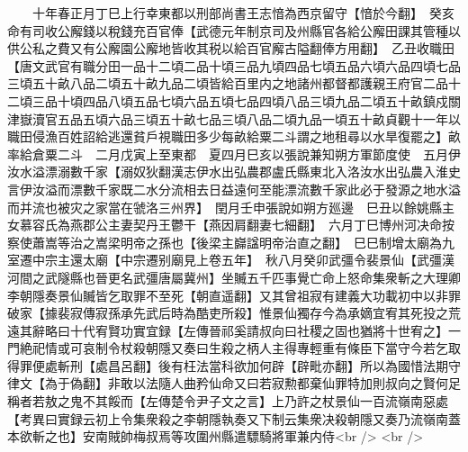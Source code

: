 　　十年春正月丁巳上行幸東都以刑部尚書王志愔為西京留守【愔於今翻】　癸亥命有司收公廨錢以稅錢充百官俸【武德元年制京司及州縣官各給公廨田課其管種以供公私之費又有公廨園公廨地皆收其税以給百官廨古隘翻俸方用翻】　乙丑收職田【唐文武官有職分田一品十二頃二品十頃三品九頃四品七頃五品六頃六品四頃七品三頃五十畝八品二頃五十畝九品二頃皆給百里内之地諸州都督都護親王府官二品十二頃三品十頃四品八頃五品七頃六品五頃七品四頃八品三頃九品二頃五十畝鎮戍關津嶽瀆官五品五頃六品三頃五十畝七品三頃八品二頃九品一頃五十畝貞觀十一年以職田侵漁百姓詔給逃還貧戶視職田多少每畝給粟二斗謂之地租尋以水旱復罷之】畝率給倉粟二斗　二月戊寅上至東都　夏四月巳亥以張說兼知朔方軍節度使　五月伊汝水溢漂溺數千家【溺奴狄翻漢志伊水出弘農郡盧氏縣東北入洛汝水出弘農入淮史言伊汝溢而漂數千家既二水分流相去日益遠何至能漂流數千家此必于發源之地水溢而并流也被灾之家當在虢洛三州界】　閏月壬申張說如朔方廵邊　巳丑以餘姚縣主女慕容氏為燕郡公主妻契丹王鬱干【燕因肩翻妻七細翻】　六月丁巳博州河决命按察使蕭嵩等治之嵩梁明帝之孫也【後梁主巋諡明帝治直之翻】　巳巳制增太廟為九室遷中宗主還太廟【中宗遷别廟見上卷五年】　秋八月癸卯武彊令裴景仙【武彊漢河間之武隧縣也晉更名武彊唐屬冀州】坐贓五千匹事覺亡命上怒命集衆斬之大理卿李朝隱奏景仙贓皆乞取罪不至死【朝直遥翻】又其曾祖寂有建義大功載初中以非罪破家【據裴寂傳寂孫承先武后時為酷吏所殺】惟景仙獨存今為承嫡宜宥其死投之荒遠其辭略曰十代宥賢功實宜録【左傳晉祁奚請叔向曰社稷之固也猶將十世宥之】一門絶祀情或可哀制令杖殺朝隱又奏曰生殺之柄人主得專輕重有條臣下當守今若乞取得罪便處斬刑【處昌呂翻】後有枉法當科欲加何辟【辟毗亦翻】所以為國惜法期守律文【為于偽翻】非敢以法隨人曲矜仙命又曰若寂勲都棄仙罪特加則叔向之賢何足稱者若敖之鬼不其餒而【左傳楚令尹子文之言】上乃許之杖景仙一百流嶺南惡處【考異曰實録云初上令集衆殺之李朝隱執奏又下制云集衆决殺朝隱又奏乃流嶺南蓋本欲斬之也】安南賊帥梅叔焉等攻圍州縣遣驃騎將軍兼内侍<br />
<br />
